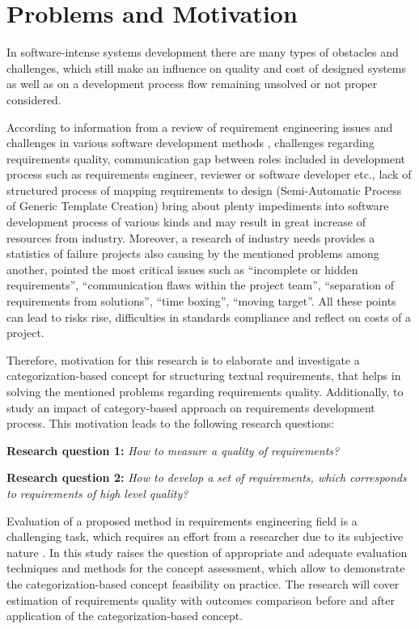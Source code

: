 \section{Problems and Motivation}
In software-intense systems development there are many types of obstacles and challenges, which still make an influence on quality and cost of designed systems as well as on a development process flow remaining unsolved or not proper considered.
 
According to information from a review of requirement engineering issues and challenges in various software development methods \cite{1Review}, challenges regarding requirements quality, communication gap between roles included in development process such as requirements engineer, reviewer or software developer etc., lack of structured process of mapping requirements to design (Semi-Automatic Process of Generic Template Creation) bring about plenty impediments into software development process of various kinds and may result in great increase of resources from industry. Moreover, a research of industry needs\cite{16NaPiRe} provides a statistics of failure projects also causing by the mentioned problems among another, pointed the most critical issues such as ``incomplete or hidden requirements'', ``communication flaws within the project team'', ``separation of requirements from solutions'', ``time boxing'', ``moving target''\cite{16NaPiRe}. All these points can lead to risks rise, difficulties in standards compliance and reflect on costs of a project.
 
Therefore, motivation for this research is to elaborate and investigate a categorization-based concept for structuring textual requirements, that helps in solving the mentioned problems regarding requirements quality. Additionally, to study an impact of category-based approach on requirements development process. This motivation leads to the following research questions: 

\textbf{Research question 1:} \textit{How to measure a quality of requirements?}

\textbf{Research question 2:} \textit{How to develop a set of requirements, which corresponds to requirements of high level quality?}

Evaluation of a proposed method in requirements engineering field is a challenging task, which requires an effort from a researcher due to its subjective nature \cite{16NaPiRe}. In this study raises the question of appropriate and adequate evaluation techniques and methods for the concept assessment, which allow to demonstrate the categorization-based concept feasibility on practice. The research will cover estimation of requirements quality with outcomes comparison before and after application of the categorization-based concept.

